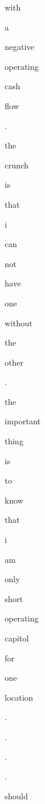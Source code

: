 \documentclass[varwidth]{standalone}
\begin{document}
\begin{CJK*}{UTF8}{gbsn}
{{{\colorbox{red!0.33518428}{\strut with} \colorbox{red!0.38555586}{\strut a} \colorbox{red!0.37191984}{\strut negative} \colorbox{red!2.982171}{\strut operating} \colorbox{red!3.5165064}{\strut cash} \colorbox{red!1.3948355}{\strut flow} \colorbox{red!1.2961379}{\strut .} \colorbox{red!0.7138066}{\strut the} \colorbox{red!2.4570837}{\strut crunch} \colorbox{red!0.69450533}{\strut is} \colorbox{red!0.572929}{\strut that} \colorbox{red!0.19541681}{\strut i} \colorbox{red!0.65584147}{\strut can} \colorbox{red!0.52102757}{\strut not} \colorbox{red!0.6879653}{\strut have} \colorbox{red!0.8984927}{\strut one} \colorbox{red!0.3325498}{\strut without} \colorbox{red!1.0574671}{\strut the} \colorbox{red!0.9430697}{\strut other} \colorbox{red!1.27503}{\strut .} \colorbox{red!0.608378}{\strut the} \colorbox{red!0.81096524}{\strut important} \colorbox{red!0.58537734}{\strut thing} \colorbox{red!0.48102066}{\strut is} \colorbox{red!0.6628109}{\strut to} \colorbox{red!0.8451052}{\strut know} \colorbox{red!0.56192493}{\strut that} \colorbox{blue!0.65124774}{\strut i} \colorbox{red!0.3113435}{\strut am} \colorbox{red!1.0696579}{\strut only} \colorbox{red!1.1951087}{\strut short} \colorbox{red!4.466255}{\strut operating} \colorbox{red!2.263183}{\strut capitol} \colorbox{red!2.0033202}{\strut for} \colorbox{red!1.216756}{\strut one} \colorbox{red!5.06013}{\strut location} \colorbox{red!0.73087937}{\strut .} \colorbox{red!0.51403004}{\strut .} \colorbox{red!0.46539208}{\strut .} \colorbox{red!0.27175722}{\strut .} \colorbox{red!2.2122447}{\strut should} 
}}}
\end{CJK*}
\end{document}
